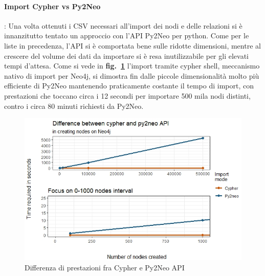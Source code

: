 \documentclass[fleqn,10pt]{SelfArx} %
\begin{document}
{{\paragraph{Import Cypher vs Py2Neo}: Una volta ottenuti i CSV necessari all'import dei nodi e delle relazioni si è innanzitutto tentato un approccio con l'API Py2Neo per python. 
Come per le liste in precedenza, l'API si è comportata bene sulle ridotte dimensioni, mentre al crescere del volume dei dati da importare si è resa inutilizzabile per gli elevati tempi d'attesa. 
Come si vede in \textbf{fig.~\ref{plot_cypher_py2neo}} l'import tramite cypher shell, meccanismo nativo di import per Neo4j, si dimostra fin dalle piccole dimensionalità molto più efficiente di Py2Neo mantenendo praticamente costante il tempo di import, con prestazioni che toccano circa i 12 secondi per importare 500 mila nodi distinti, contro i circa 80 minuti richiesti da Py2Neo.
\begin{figure}
\centering
\includegraphics[scale=0.54]{viz_benchmark_cypher_py2neo.jpeg}
\caption{\label{plot_cypher_py2neo} Differenza di prestazioni fra Cypher e Py2Neo API}
\end{figure}
}}
\end{document}
